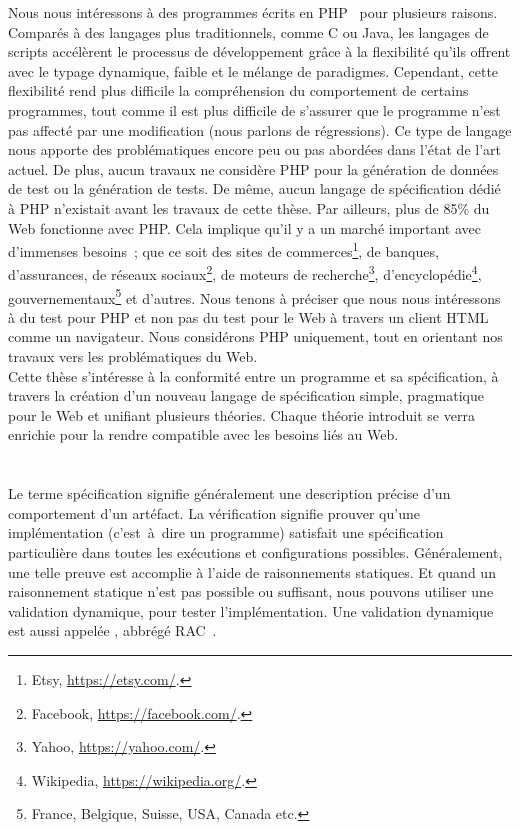 Nous nous intéressons à des programmes écrits en PHP~ pour plusieurs
raisons. Comparés à des langages plus traditionnels, comme C ou Java, les
langages de scripts accélèrent le processus de développement grâce à la
flexibilité qu'ils offrent avec le typage dynamique, faible et le mélange de
paradigmes. Cependant, cette flexibilité rend plus difficile la compréhension du
comportement de certains programmes, tout comme il est plus difficile de
s'assurer que le programme n'est pas affecté par une modification (nous parlons
de {\strong régressions}). Ce type de langage nous apporte des problématiques
encore peu ou pas abordées dans l'état de l'art actuel. De plus, aucun travaux
ne considère PHP pour la génération de données de test ou la génération de
tests. De même, aucun langage de spécification dédié à PHP n'existait avant les
travaux de cette thèse. Par ailleurs, plus de 85\% du Web fonctionne avec PHP.
Cela implique qu'il y a un marché important avec d'immenses besoins~; que ce
soit des sites de commerces\footnote{Etsy, \url{https://etsy.com/}.}, de
banques, d'assurances, de réseaux sociaux\footnote{Facebook,
\url{https://facebook.com/}.}, de moteurs de recherche\footnote{Yahoo,
\url{https://yahoo.com/}.}, d'encyclopédie\footnote{Wikipedia,
\url{https://wikipedia.org/}.}, gouvernementaux\footnote{France, Belgique,
Suisse, USA, Canada etc.} et d'autres. Nous tenons à préciser que nous nous
intéressons à du test pour PHP et non pas du test pour le Web à travers un
client HTML comme un navigateur. Nous considérons PHP uniquement, tout en
orientant nos travaux vers les problématiques du Web. \\

Cette thèse s'intéresse à la conformité entre un programme et sa spécification,
à travers la création d'un nouveau langage de spécification simple, pragmatique
pour le Web et unifiant plusieurs théories. Chaque théorie introduit se verra
enrichie pour la rendre compatible avec les besoins liés au Web.

\section{}
\label{section:sota:bisl}

Le terme {\strong spécification} signifie généralement une description précise
d'un comportement d'un artéfact. La {\strong vérification} signifie prouver
qu'une implémentation (c'est~à~dire un programme) satisfait une spécification
particulière dans toutes les exécutions et configurations possibles.
Généralement, une telle preuve est accomplie à l'aide de raisonnements
statiques. Et quand un raisonnement statique n'est pas possible ou suffisant,
nous pouvons utiliser une {\strong validation} dynamique, pour tester
l'implémentation. Une validation dynamique est aussi appelée , abbrégé RAC~.

